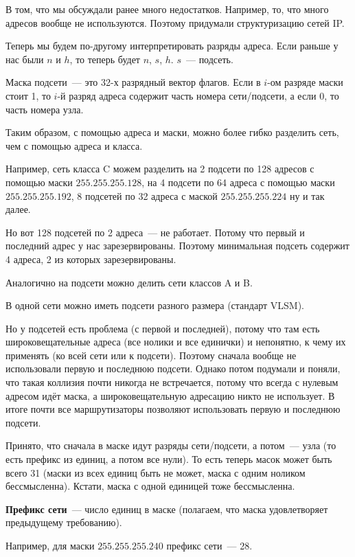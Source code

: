 
В том, что мы обсуждали ранее много недостатков. Например, то, что много адресов вообще не используются. Поэтому придумали структуризацию сетей IP.

Теперь мы будем по-другому интерпретировать разряды адреса. Если раньше у нас были $n$ и $h$, то теперь будет $n$, $s$, $h$. $s$~--- подсеть.

Маска подсети~--- это 32-х разрядный вектор флагов. Если в $i$-ом разряде маски стоит 1, то $i$-й разряд адреса содержит часть номера сети/подсети, а если 0, то часть номера узла.

Таким образом, с помощью адреса и маски, можно более гибко разделить сеть, чем с помощью адреса и класса.

Например, сеть класса C можем разделить на 2 подсети по 128 адресов с помощью маски $255.255.255.128$, на 4 подсети по 64 адреса с помощью маски $255.255.255.192$, 8 подсетей по 32 адреса с маской $255.255.255.224$ ну и так далее.

Но вот 128 подсетей по 2 адреса~--- не работает. Потому что первый и последний адрес у нас зарезервированы. Поэтому минимальная подсеть содержит 4 адреса, 2 из которых зарезервированы.

Аналогично на подсети можно делить сети классов A и B.

В одной сети можно иметь подсети разного размера (стандарт VLSM).

Но у подсетей есть проблема (с первой и последней), потому что там есть широковещательные адреса (все нолики и все единички) и непонятно, к чему их применять (ко всей сети или к подсети). Поэтому сначала вообще не использовали первую и последнюю подсети. Однако потом подумали и поняли, что такая коллизия почти никогда не встречается, потому что всегда с нулевым адресом идёт маска, а широковещательную адресацию никто не использует. В итоге почти все маршрутизаторы позволяют использовать первую и последнюю подсети.

Принято, что сначала в маске идут разряды сети/подсети, а потом~--- узла (то есть префикс из единиц, а потом все нули). То есть теперь масок может быть всего 31 (маски из всех единиц быть не может, маска с одним ноликом бессмысленна). Кстати, маска с одной единицей тоже бессмысленна.

{\bf Префикс сети}~--- число единиц в маске (полагаем, что маска удовлетворяет предыдущему требованию).

Например, для маски $255.255.255.240$ префикс сети~--- 28.

